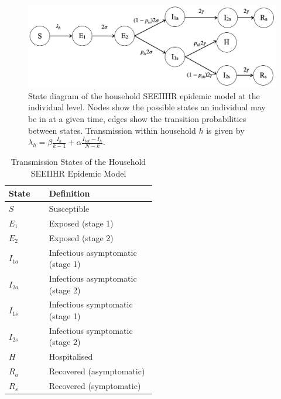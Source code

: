 \begin{figure}[h!]
	\centering
	\includegraphics[scale=0.4]{Figs/SEEIIHR_markov_chain2.png}
	\caption{State diagram of the household SEEIIHR epidemic model at the individual level. Nodes show the possible states an individual may be in at a given time, edges show the transition probabilities between states. Transmission within household $h$ is given by $\lambda_h = \beta \frac{I_h}{k-1} + \alpha \frac{I_{tot}-I_h}{N-k}$.}
	\label{fig:SEEIIRH_model}
\end{figure}

\begin{table}[h!]
	\centering
	\caption{Transmission States of the Household SEEIIHR Epidemic Model}
	\begin{tabular}{p{0.1\linewidth}p{0.4\linewidth}}
		\toprule
		State      & Definition \\
		\midrule
		$S$        & Susceptible \\
		$E_{1}$   & Exposed (stage 1) \\
		$E_{2}$   & Exposed (stage 2) \\
		$I_{1a}$   & Infectious asymptomatic (stage 1) \\
		$I_{2a}$   & Infectious asymptomatic (stage 2) \\
		$I_{1s}$   & Infectious symptomatic (stage 1) \\
		$I_{2s}$   & Infectious symptomatic (stage 2) \\
		$H$         & Hospitalised \\
		$R_a$     & Recovered (asymptomatic) \\
		$R_s$     & Recovered (symptomatic) \\
		\bottomrule
	\end{tabular}
	\label{tab: Transmission states}
\end{table}%

